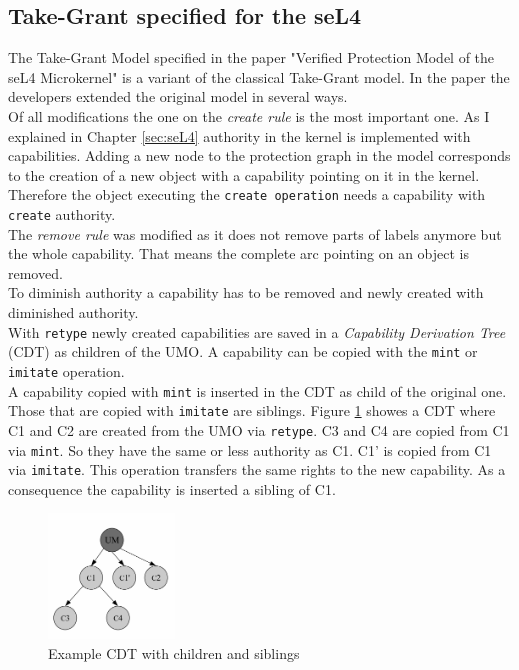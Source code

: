 \subsection{Take-Grant specified for the seL4}\label{specT}
The Take-Grant Model specified in the paper "Verified Protection Model of the seL4 Microkernel" \cite{TakeG} is a variant of the classical Take-Grant model. In the paper the developers extended the original model in several ways. \\
Of all modifications the one on the \textit{create rule} is the most important one. As I explained in Chapter \ref{sec:seL4} authority in the kernel is implemented with capabilities. Adding a new node to the protection graph in the model corresponds to the creation of a new object with a capability pointing on it in the kernel. Therefore the object executing the \texttt{create operation} needs a capability with \texttt{create} authority. \\
The \textit{remove rule} was modified as it does not remove parts of labels anymore but the whole capability. That means the complete arc pointing on an object is removed. \\
To diminish authority a capability has to be removed and newly created with diminished authority. \\
With \texttt{retype} newly created capabilities are saved in a \textit{Capability Derivation Tree} (CDT) as children of the UMO. A capability can be copied with the \texttt{mint} or \texttt{imitate} operation. \\ 
A capability  copied with \texttt{mint} is inserted in the CDT as child of the original one. Those that are copied with \texttt{imitate} are siblings. Figure \ref{fig:cdt} showes a CDT where C1 and C2 are created from the UMO via \texttt{retype}. C3 and C4 are copied from C1 via \texttt{mint}. So they have the same or less authority as C1. C1' is copied from C1 via \texttt{imitate}. This operation transfers the same rights to the new capability. As a consequence the capability is inserted a sibling of C1. \\
	\begin{figure}[H]
	\centering
	\includegraphics[width=0.3\textwidth]{./Pictures/CDT.jpg}
	\caption[CDT]{Example CDT with children and siblings \cite{PhDseL4}}
	\label{fig:cdt}
	\end{figure}
